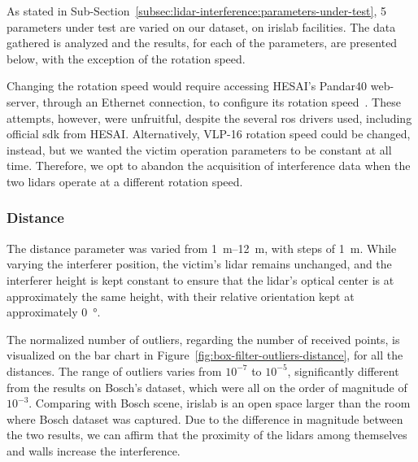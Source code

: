 As stated in Sub-Section~\ref{subsec:lidar-interference:parameters-under-test}, 5 parameters under test are varied on our dataset, on \ac{irislab} facilities. The data gathered is analyzed and the results, for each of the parameters, are presented below, with the exception of the rotation speed.

Changing the rotation speed would require accessing HESAI's Pandar40 web-server, through an Ethernet connection, to configure its rotation speed~\cite{Pandar40UserGuide}. These attempts, however, were unfruitful, despite the several \ac{ros} drivers used, including official \ac{sdk} from HESAI\cp. Alternatively, VLP-16 rotation speed could be changed, instead, but we wanted the victim operation parameters to be constant at all time. Therefore, we opt to abandon the acquisition of interference data when the two \acp{lidar} operate at a different rotation speed.

\subsubsection{Distance}
The distance parameter was varied from \SIrange{1}{12}{\meter}, with steps of \SI{1}{\meter}. While varying the interferer position, the victim's \ac{lidar} remains unchanged, and the interferer height is kept constant to ensure that the \ac{lidar}'s optical center is at approximately the same height, with their relative orientation kept at approximately \SI{0}{\degree}.

The normalized number of outliers, regarding the number of received points, is visualized on the bar chart in Figure~\ref{fig:box-filter-outliers-distance}, for all the distances. The range of outliers varies from $10^{-7}$ to $10^{-5}$, significantly different from the results on Bosch's dataset, which were all on the order of magnitude of $10^{-3}$. Comparing with Bosch scene, \ac{irislab} is an open space larger than the room where Bosch dataset was captured. Due to the difference in magnitude between the two results, we can affirm that the proximity of the \acp{lidar} among themselves and walls increase the interference. 


